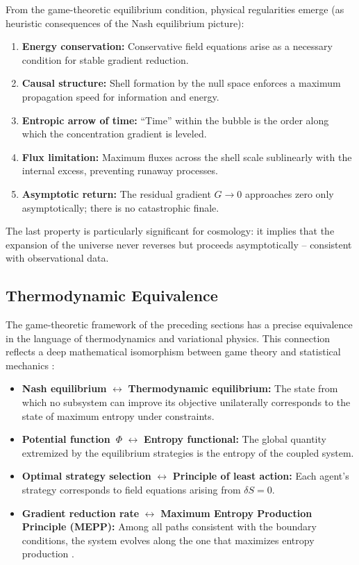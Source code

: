 \documentclass[aps,prd,twocolumn,superscriptaddress,nofootinbib]{revtex4-2}
\begin{document}
From the game-theoretic equilibrium condition, physical regularities emerge (as heuristic consequences of the Nash equilibrium picture):

\begin{enumerate}
\item \textbf{Energy conservation:} Conservative field equations arise as a necessary condition for stable gradient reduction.
\item \textbf{Causal structure:} Shell formation by the null space enforces a maximum propagation speed for information and energy.
\item \textbf{Entropic arrow of time:} ``Time'' within the bubble is the order along which the concentration gradient is leveled.
\item \textbf{Flux limitation:} Maximum fluxes across the shell scale sublinearly with the internal excess, preventing runaway processes.
\item \textbf{Asymptotic return:} The residual gradient $G \to 0$ approaches zero only asymptotically; there is no catastrophic finale.
\end{enumerate}

The last property is particularly significant for cosmology: it implies that the expansion of the universe never reverses but proceeds asymptotically -- consistent with observational data.


\subsection{Thermodynamic Equivalence}
\label{subsec:thermodynamic}

The game-theoretic framework of the preceding sections has a precise equivalence in the language of thermodynamics and variational physics. This connection reflects a deep mathematical isomorphism between game theory and statistical mechanics \cite{Wolpert2006}:

\begin{itemize}
\item \textbf{Nash equilibrium} $\leftrightarrow$ \textbf{Thermodynamic equilibrium:} The state from which no subsystem can improve its objective unilaterally corresponds to the state of maximum entropy under constraints.
\item \textbf{Potential function~$\Phi$} $\leftrightarrow$ \textbf{Entropy functional:} The global quantity extremized by the equilibrium strategies is the entropy of the coupled system.
\item \textbf{Optimal strategy selection} $\leftrightarrow$ \textbf{Principle of least action:} Each agent's strategy corresponds to field equations arising from $\delta S = 0$.
\item \textbf{Gradient reduction rate} $\leftrightarrow$ \textbf{Maximum Entropy Production Principle (MEPP):} Among all paths consistent with the boundary conditions, the system evolves along the one that maximizes entropy production \cite{Dewar2003}.
\end{itemize}
\end{document}
